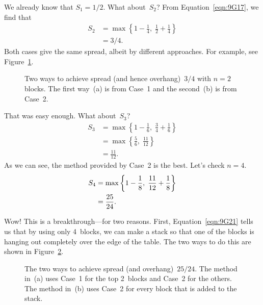 We already know that $S_1 = 1/2$.  What about~$S_2$?  From
Equation~\ref{eqn:9G17}, we find that
\begin{align*}
S_2
    &= \max \left\{ 1 - \frac{1}{4}, \; \frac{1}{2} + \frac{1}{4} \right \} \\
    &= 3/4.
\end{align*}
Both cases give the same spread, albeit by different approaches.  For
example, see Figure~\ref{fig:9G20}.

\begin{figure}



\caption{Two ways to achieve spread (and hence overhang)~$3/4$ with $n
  = 2$ blocks.  The first way~(a) is from Case~1 and the second~(b) is
  from Case~2.}

\label{fig:9G20}

\end{figure}

That was easy enough.  What about~$S_3$?
\begin{align*}
S_3 &= \max\left\{ 1 - \frac{1}{6}, \; \frac{3}{4} + \frac{1}{6} \right\} \\
    &= \max\left\{ \frac{5}{6}, \; \frac{11}{12} \right\} \\
    &= \frac{11}{12}.
\end{align*}
As we can see, the method provided by Case~2 is the best.  Let's check
$n = 4$.
\begin{align}
S_4 &= \max\left\{ 1 - \frac{1}{8}, \; \frac{11}{12} + \frac{1}{8} \right\}
    \notag \\
    &= \frac{25}{24}. \label{eqn:9G21}
\end{align}

Wow!  This is a breakthrough---for two reasons.  First,
Equation~\ref{eqn:9G21} tells us that by using only 4~blocks, we can
make a stack so that one of the blocks is hanging out completely over
the edge of the table.  The two ways to do this are shown in
Figure~\ref{fig:9G22}.

\begin{figure}



\caption{The two ways to achieve spread (and overhang)~$25/24$.  The
  method in~(a) uses Case~1 for the top 2~blocks and Case~2 for the
  others.  The method in~(b) uses Case~2 for every block that is added
to the stack.}

\label{fig:9G22}

\end{figure}

